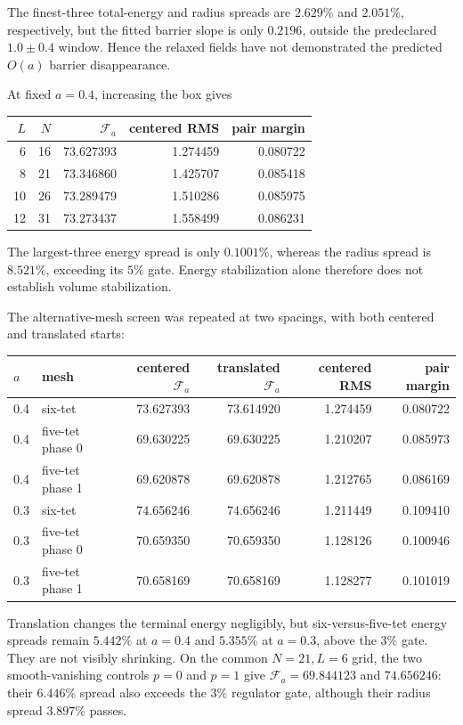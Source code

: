 \documentclass[11pt]{article}
\numberwithin{equation}{section}
\theoremstyle{definition}
\theoremstyle{remark}
\newcommand{\cF}{\mathcal F}
\begin{document}
The finest-three total-energy and radius spreads are $2.629\%$ and
$2.051\%$, respectively, but the fitted barrier slope is only $0.2196$,
outside the predeclared $1.0\pm0.4$ window.  Hence the relaxed fields have
not demonstrated the predicted $O(a)$ barrier disappearance.

At fixed $a=0.4$, increasing the box gives

\begin{center}
\begin{tabular}{rrrrr}
\toprule
$L$&$N$&$\cF_a$&centered RMS&pair margin\\
\midrule
6&16&73.627393&1.274459&0.080722\\
8&21&73.346860&1.425707&0.085418\\
10&26&73.289479&1.510286&0.085975\\
12&31&73.273437&1.558499&0.086231\\
\bottomrule
\end{tabular}
\end{center}

The largest-three energy spread is only $0.1001\%$, whereas the radius
spread is $8.521\%$, exceeding its $5\%$ gate.  Energy stabilization alone
therefore does not establish volume stabilization.

The alternative-mesh screen was repeated at two spacings, with both
centered and translated starts:

\begin{center}
\small
\begin{tabular}{llrrrr}
\toprule
$a$&mesh&centered $\cF_a$&translated $\cF_a$&centered RMS&pair margin\\
\midrule
0.4&six-tet&73.627393&73.614920&1.274459&0.080722\\
0.4&five-tet phase 0&69.630225&69.630225&1.210207&0.085973\\
0.4&five-tet phase 1&69.620878&69.620878&1.212765&0.086169\\
0.3&six-tet&74.656246&74.656246&1.211449&0.109410\\
0.3&five-tet phase 0&70.659350&70.659350&1.128126&0.100946\\
0.3&five-tet phase 1&70.658169&70.658169&1.128277&0.101019\\
\bottomrule
\end{tabular}
\end{center}

Translation changes the terminal energy negligibly, but six-versus-five-tet
energy spreads remain $5.442\%$ at $a=0.4$ and $5.355\%$ at $a=0.3$,
above the $3\%$ gate.  They are not visibly shrinking.  On the common
$N=21,L=6$ grid, the two smooth-vanishing controls $p=0$ and $p=1$ give
$\cF_a=69.844123$ and $74.656246$: their $6.446\%$ spread also exceeds
the $3\%$ regulator gate, although their radius spread $3.897\%$ passes.
\end{document}

